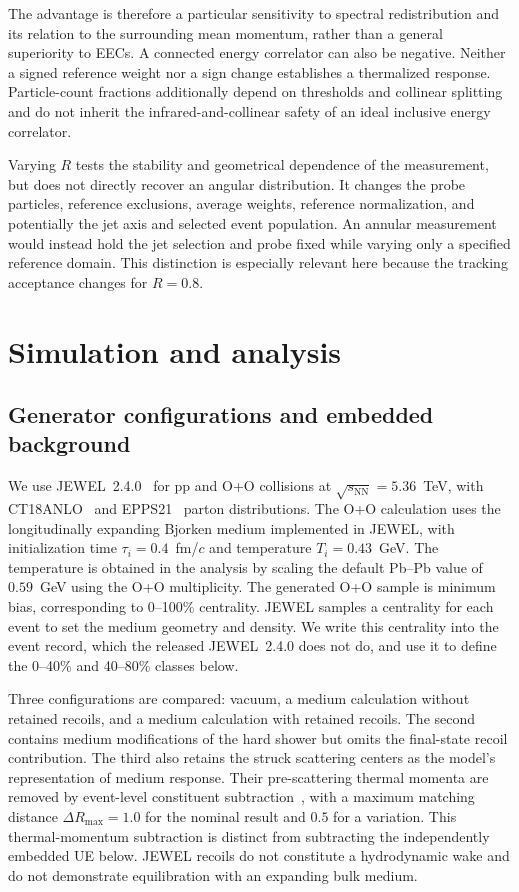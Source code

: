 \documentclass[aps,prc,twocolumn,superscriptaddress,nofootinbib,longbibliography,floatfix,10pt]{revtex4-2}
\begin{document}
The advantage is therefore a particular sensitivity to spectral redistribution and its relation to the surrounding mean momentum, rather than a general superiority to EECs. A connected energy correlator can also be negative. Neither a signed reference weight nor a sign change establishes a thermalized response. Particle-count fractions additionally depend on thresholds and collinear splitting and do not inherit the infrared-and-collinear safety of an ideal inclusive energy correlator.

Varying $R$ tests the stability and geometrical dependence of the measurement, but does not directly recover an angular distribution. It changes the probe particles, reference exclusions, average weights, reference normalization, and potentially the jet axis and selected event population. An annular measurement would instead hold the jet selection and probe fixed while varying only a specified reference domain. This distinction is especially relevant here because the tracking acceptance changes for $R=0.8$.

\section{Simulation and analysis}\label{sec:setup}
\subsection{Generator configurations and embedded background}
We use JEWEL~2.4.0~\cite{ZappFramework,ZappManual} for pp and O+O collisions at $\sqrt{s_{\mathrm{NN}}}=5.36$~TeV, with CT18ANLO~\cite{CT18} and EPPS21~\cite{EPPS21} parton distributions. The O+O calculation uses the longitudinally expanding Bjorken medium implemented in JEWEL, with initialization time $\tau_i=0.4$~fm/$c$ and temperature $T_i=0.43$~GeV. The temperature is obtained in the analysis by scaling the default Pb--Pb value of $0.59$~GeV using the O+O multiplicity. The generated O+O sample is minimum bias, corresponding to 0--100\% centrality. JEWEL samples a centrality for each event to set the medium geometry and density. We write this centrality into the event record, which the released JEWEL~2.4.0 does not do, and use it to define the 0--40\% and 40--80\% classes below.

Three configurations are compared: vacuum, a medium calculation without retained recoils, and a medium calculation with retained recoils. The second contains medium modifications of the hard shower but omits the final-state recoil contribution. The third also retains the struck scattering centers as the model's representation of medium response. Their pre-scattering thermal momenta are removed by event-level constituent subtraction~\cite{Milhano}, with a maximum matching distance $\Delta R_{\max}=1.0$ for the nominal result and $0.5$ for a variation. This thermal-momentum subtraction is distinct from subtracting the independently embedded UE below. JEWEL recoils do not constitute a hydrodynamic wake and do not demonstrate equilibration with an expanding bulk medium.
\end{document}
